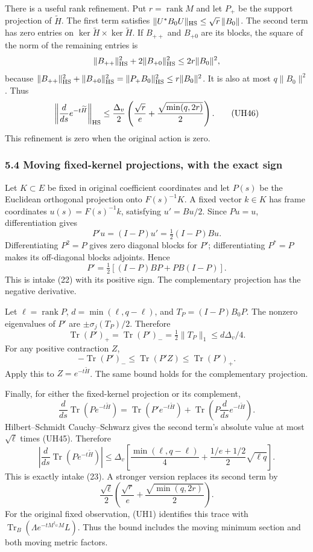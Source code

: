 \documentclass[11pt]{article}
\begin{document}
There is a useful rank refinement. Put \(r=\operatorname{rank}M\) and let \(P_+\) be the support projection of \(\widetilde H\). The first term satisfies \(\|U^*B_0U\|_{\rm HS}\le\sqrt r\,\|B_0\|\). The second term has zero entries on \(\ker\widetilde H\times\ker\widetilde H\). If \(B_{++}\) and \(B_{+0}\) are its blocks, the square of the norm of the remaining entries is \[
 \|B_{++}\|_{\rm HS}^2+2\|B_{+0}\|_{\rm HS}^2
 \le2r\|B_0\|^2,
\] because \(\|B_{++}\|_{\rm HS}^2+\|B_{+0}\|_{\rm HS}^2
 =\|P_+B_0\|_{\rm HS}^2\le r\|B_0\|^2\). It is also at most \(q\|B_0\|^2\). Thus \[
 \left\|\frac d{ds}e^{-t\widetilde H}\right\|_{\rm HS}
 \le\frac{\Delta_v}{2}
       \left(\frac{\sqrt r}{e}
              +\frac{\sqrt{\min(q,2r)}}2\right).
 \tag{UH46}
\] This refinement is zero when the original action is zero.

\subsubsection{5.4 Moving fixed-kernel projections, with the exact sign}\label{moving-fixed-kernel-projections-with-the-exact-sign}

Let \(K\subset E\) be fixed in original coefficient coordinates and let \(P(s)\) be the Euclidean orthogonal projection onto \(F(s)^{-1}K\). A fixed vector \(k\in K\) has frame coordinates \(u(s)=F(s)^{-1}k\), satisfying \(u'=Bu/2\). Since \(Pu=u\), differentiation gives \[
 P'u=(I-P)u'=\tfrac12(I-P)Bu.
\] Differentiating \(P^2=P\) gives zero diagonal blocks for \(P'\); differentiating \(P^*=P\) makes its off-diagonal blocks adjoints. Hence \[
 P'=\tfrac12[(I-P)BP+PB(I-P)].
 \tag{UH47}
\] This is intake (22) with its positive sign. The complementary projection has the negative derivative.

Let \(\ell=\operatorname{rank}P\), \(d=\min(\ell,q-\ell)\), and \(T_P=(I-P)B_0P\). The nonzero eigenvalues of \(P'\) are \(\pm\sigma_j(T_P)/2\). Therefore \[
 \operatorname{Tr}(P')_+
 =\operatorname{Tr}(P')_-
 =\tfrac12\|T_P\|_1
 \le d\Delta_v/4.
 \tag{UH48}
\] For any positive contraction \(Z\), \[
 -\operatorname{Tr}(P')_-\le\operatorname{Tr}(P'Z)
                    \le\operatorname{Tr}(P')_+.
\] Apply this to \(Z=e^{-t\widetilde H}\). The same bound holds for the complementary projection.

Finally, for either the fixed-kernel projection or its complement, \[
 \frac d{ds}\operatorname{Tr}(Pe^{-t\widetilde H})
 =\operatorname{Tr}(P'e^{-t\widetilde H})
  +\operatorname{Tr}\left(P\frac d{ds}e^{-t\widetilde H}\right).
\] Hilbert--Schmidt Cauchy--Schwarz gives the second term's absolute value at most \(\sqrt\ell\) times (UH45). Therefore \[
\boxed{
 \left|\frac d{ds}\operatorname{Tr}(Pe^{-t\widetilde H})\right|
 \le\Delta_v\left[
 \frac{\min(\ell,q-\ell)}4+
 \frac{1/e+1/2}{2}\sqrt{\ell q}\right].}
 \tag{UH49}
\] This is exactly intake (23). A stronger version replaces its second term by \[
 \frac{\sqrt\ell}{2}
 \left(\frac{\sqrt r}{e}+\frac{\sqrt{\min(q,2r)}}2\right).
 \tag{UH50}
\] For the original fixed observation, (UH1) identifies this trace with \(\operatorname{Tr}_B(\Lambda e^{-tM^{\dagger_G}M}L)\). Thus the bound includes the moving minimum section and both moving metric factors.
\end{document}
